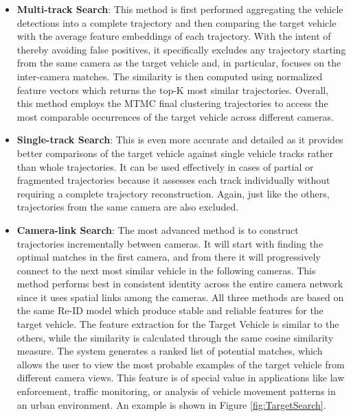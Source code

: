 \begin{itemize}
    \item \textbf{Multi-track Search}: This method is first performed aggregating the vehicle detections into a complete trajectory and then comparing the target vehicle with the average feature embeddings of each trajectory. With the intent of thereby avoiding false positives, it specifically excludes any trajectory starting from the same camera as the target vehicle and, in particular, focuses on the inter-camera matches. The similarity is then computed using normalized feature vectors which returns the top-K most similar trajectories. Overall, this method employs the MTMC final clustering trajectories to access the most comparable occurrences of the target vehicle across different cameras.
    \item \textbf{Single-track Search}: This is even more accurate and detailed as it provides better comparisons of the target vehicle against single vehicle tracks rather than whole trajectories. It can be used effectively in cases of partial or fragmented trajectories because it assesses each track individually without requiring a complete trajectory reconstruction. Again, just like the others, trajectories from the same camera are also excluded. 
    \item \textbf{Camera-link Search}: The most advanced method is to construct trajectories incrementally between cameras. It will start with finding the optimal matches in the first camera, and from there it will progressively connect to the next most similar vehicle in the following cameras. This method performs best in consistent identity across the entire camera network since it uses spatial links among the cameras.
    All three methods are based on the same Re-ID model which produce stable and reliable features for the target vehicle.
    The feature extraction for the Target Vehicle is similar to the others, while the similarity is calculated through the same cosine similarity measure. The system generates a ranked list of potential matches, which allows the user to view the most probable examples of the target vehicle from different camera views. This feature is of special value in applications like law enforcement, traffic monitoring, or analysis of vehicle movement patterns in an urban environment. An example is shown in Figure \ref{fig:TargetSearch}.
\end{itemize}

